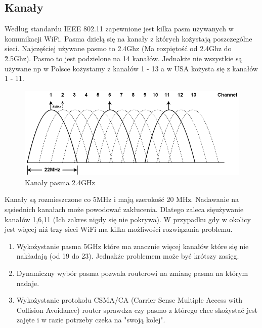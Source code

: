 \documentclass{article}
\begin{document}
        \subsection{Kanały}
            Według standardu IEEE 802.11 zapewnione jest kilka pasm używanych w komunikacji
            WiFi. Pasma dzielą się na kanały z których kożystają poszczególne sieci. 
            Najczęściej używane pasmo to 2.4Ghz (Ma rozpiętość od 2.4Ghz do \~2.5Ghz).
            Pasmo to jest podzielone na 14 kanałów. Jednakże nie wszystkie są używane
            np w Polsce kożystamy z kanałów 1 - 13 a w USA kożysta się z kanałów 1 - 11.
            \begin{figure}[ht]
                \centering
                \includegraphics[width=\textwidth]{images/WiFiBands.png}
                \caption{Kanały pasma 2.4GHz}
                \label{fig:WiFiBands}
            \end{figure}
            \FloatBarrier
            Kanały są rozmieszczone co 5MHz i mają szerokość 20 MHz. Nadawanie na sąsiednich
            kanałach może powodować zakłucenia. Dlatego zaleca sięużywanie kanałów 1,6,11 
            (Ich zakres nigdy się nie pokrywa). W przypadku gdy w okolicy jest więcej niż
            trzy sieci WiFi ma kilka możliwości rozwiązania problemu.
            \begin{enumerate}
                \item Wykożystanie pasma 5GHz które ma znacznie więcej kanałów które się nie 
                    nakładają (od 19 do 23). Jednakże problemem może być krótszy zasięg.
                \item Dynamiczny wybór pasma pozwala routerowi na zmianę pasma na którym nadaje.
                \item Wykożystanie protokołu CSMA/CA (Carrier Sense Multiple Access with 
                    Collision Avoidance) router sprawdza czy pasmo z którego chce skożystać 
                    jest zajęte i w razie potrzeby czeka na "swoją kolej".
            \end{enumerate}
\end{document}
